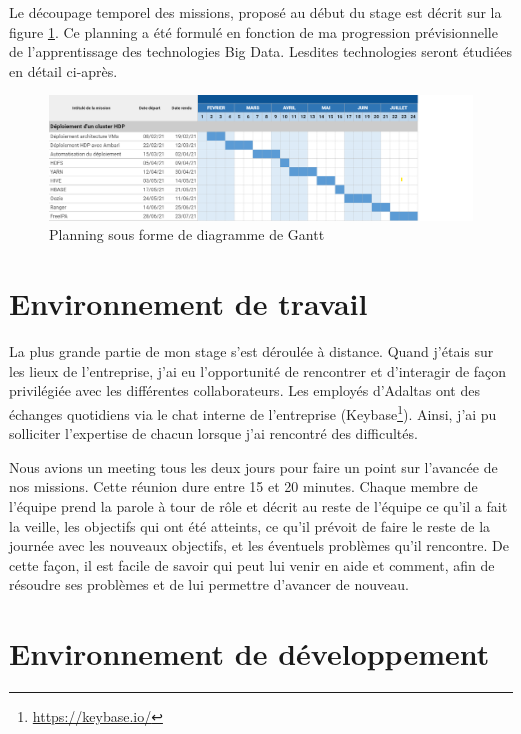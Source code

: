 \documentclass[12pt, french]{report}
\begin{document}
Le découpage temporel des missions, proposé au début du stage est décrit sur la figure \ref{fig:planning}. Ce planning a été formulé en fonction de ma progression prévisionnelle de l'apprentissage des technologies Big Data. Lesdites technologies seront étudiées en détail ci-après.

\begin{figure}[h]
\includegraphics[scale=0.5]{assets/img/gantt.png}
\centering
\caption{Planning sous forme de diagramme de Gantt}
\label{fig:planning}
\end{figure}

\section{Environnement de travail}

La plus grande partie de mon stage s'est déroulée à distance. Quand j'étais sur les lieux de l'entreprise, j'ai eu l'opportunité de rencontrer et d'interagir de façon privilégiée avec les différentes collaborateurs. Les employés d’Adaltas ont des échanges quotidiens via le chat interne de l’entreprise (Keybase\footnote{\href{https://keybase.io/}{https://keybase.io/}}). Ainsi, j'ai pu solliciter l'expertise de chacun lorsque j'ai rencontré des difficultés.

Nous avions un meeting tous les deux jours pour faire un point sur l'avancée de nos missions. Cette réunion dure entre 15 et 20 minutes. Chaque membre de l'équipe prend la parole à tour de rôle et décrit au reste de l’équipe ce qu’il a fait la veille, les objectifs qui ont été atteints, ce qu’il prévoit de faire le reste de la journée avec les nouveaux objectifs, et les éventuels problèmes qu’il rencontre. De cette façon, il est facile de savoir qui peut lui venir en aide et comment, afin de résoudre ses problèmes et de lui permettre d’avancer de nouveau.

\section{Environnement de développement}
\end{document}

